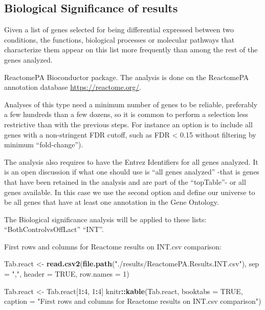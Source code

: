 \documentclass[]{article}
\newenvironment{Shaded}{\begin{snugshade}}{\end{snugshade}}
\newcommand{\KeywordTok}[1]{\textcolor[rgb]{0.13,0.29,0.53}{\textbf{#1}}}
\newcommand{\DataTypeTok}[1]{\textcolor[rgb]{0.13,0.29,0.53}{#1}}
\newcommand{\DecValTok}[1]{\textcolor[rgb]{0.00,0.00,0.81}{#1}}
\newcommand{\StringTok}[1]{\textcolor[rgb]{0.31,0.60,0.02}{#1}}
\newcommand{\OtherTok}[1]{\textcolor[rgb]{0.56,0.35,0.01}{#1}}
\newcommand{\OperatorTok}[1]{\textcolor[rgb]{0.81,0.36,0.00}{\textbf{#1}}}
\newcommand{\NormalTok}[1]{#1}
\begin{document}
\subsection{Biological Significance of
results}\label{biological-significance-of-results}

Given a list of genes selected for being differential expressed between
two conditions, the functions, biological processes or molecular
pathways that characterize them appear on this list more frequently than
among the rest of the genes analyzed.

ReactomePA Bioconductor package. The analysis is done on the ReactomePA
annotation database \url{https://reactome.org/}.

Analyses of this type need a minimum number of genes to be reliable,
preferably a few hundreds than a few dozens, so it is common to perform
a selection less restrictive than with the previous steps. For instance
an option is to include all genes with a non-stringent FDR cutoff, such
as FDR \textless{} 0.15 without filtering by minimum ``fold-change'').

The analysis also requires to have the Entrez Identifiers for all genes
analyzed. It is an open discussion if what one should use is ``all genes
analyzed'' -that is genes that have been retained in the analysis and
are part of the ``topTable''- or all genes available. In this case we
use the second option and define our universe to be all genes that have
at least one annotation in the Gene Ontology.

The Biological significance analysis will be applied to these lists:
``BothControlvsOffLact'' ``INT''.

First rows and columns for Reactome results on INT.csv comparison:

\begin{Shaded}
\begin{Highlighting}[]
\NormalTok{Tab.react <-}\StringTok{ }\KeywordTok{read.csv2}\NormalTok{(}\KeywordTok{file.path}\NormalTok{(}\StringTok{"./results/ReactomePA.Results.INT.csv"}\NormalTok{), }\DataTypeTok{sep =} \StringTok{","}\NormalTok{, }\DataTypeTok{header =} \OtherTok{TRUE}\NormalTok{, }\DataTypeTok{row.names =} \DecValTok{1}\NormalTok{)}

\NormalTok{Tab.react <-}\StringTok{ }\NormalTok{Tab.react[}\DecValTok{1}\OperatorTok{:}\DecValTok{4}\NormalTok{, }\DecValTok{1}\OperatorTok{:}\DecValTok{4}\NormalTok{]}
\NormalTok{knitr}\OperatorTok{::}\KeywordTok{kable}\NormalTok{(Tab.react, }\DataTypeTok{booktabs =} \OtherTok{TRUE}\NormalTok{, }\DataTypeTok{caption =} \StringTok{"First rows and columns for Reactome results on INT.csv comparison"}\NormalTok{)}
\end{Highlighting}
\end{Shaded}
\end{document}
